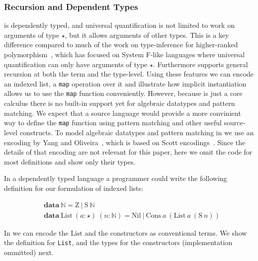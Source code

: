 \subsubsection{Recursion and Dependent Types}

\name is dependently typed, and universal quantification is not limited to work
on arguments of type $\star$, but it allows arguments of other types. This is
a key difference compared to much of the work on type-inference for higher-ranked
polymorphism~\cite{}, which has focused on System F-like
languages where universal quantification can only have arguments of type $\star$.
Furthermore \name supports general recursion at both the term and the type-level.
Using these features we can encode an indexed list, a \verb|map| operation over it
and illustrate how implicit instantiation allows us to use the \verb|map| function
conveniently.
However, because \name is just a core calculus there is no built-in support
yet for algebraic datatypes and pattern matching.
We expect that a source language would provide a more convinient
way to define the \verb|map| function using pattern matching and other useful source-level
constructs. To model algebraic datatypes and pattern matching in \name we
use an encoding by Yang and Oliveira~\cite{pits}, which is based on Scott encodings~\cite{}.
Since the details of that encoding are not relevant for this paper,
here we omit the code for most definitions and show only their types.

In a dependently typed language a programmer could write the following definition
for our formulation of indexed lists:


\newcommand{\Nat}[0]{\mathbb{N}}
\newcommand{\Succ}[0]{\mathrm{S}}
\newcommand{\Zero}[0]{\mathrm{Z}}
\newcommand{\List}[0]{\mathrm{List}}
\newcommand{\Nil}[0]{\mathrm{Nil}}
\newcommand{\Cons}[0]{\mathrm{Cons}}
\newcommand{\map}[0]{\mathrm{map}}

\begin{align*}
  & \mathbf{data} ~ \Nat = \Zero ~|~ \Succ~\Nat \\
  & \mathbf{data} ~ \List~(a : \star)~(n : \Nat) = \Nil ~ | ~ \Cons~a~(\List~a~(\Succ~n))
\end{align*}

In \name we can encode the $\mathrm{List}$ and the constructors as conventional terms. We
show the definition for \verb|List|, and the types for the constructors (implementation ommitted)
next.


